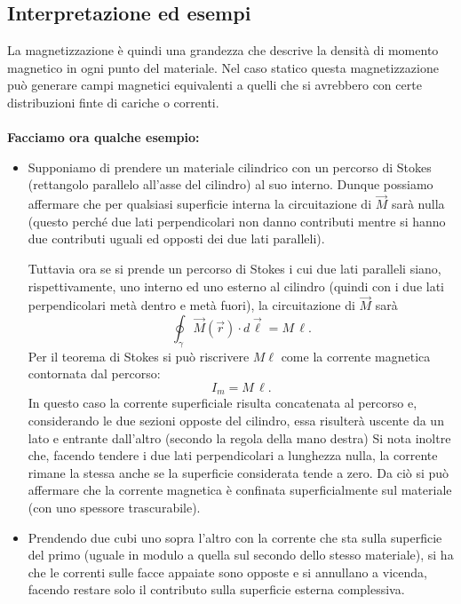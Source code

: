 \documentclass{book}
\begin{document}
\subsection*{Interpretazione ed esempi}
La magnetizzazione è quindi una grandezza che descrive la densità di momento magnetico in ogni punto del materiale. Nel caso statico questa magnetizzazione può generare campi magnetici equivalenti a quelli che si avrebbero con certe distribuzioni finte di cariche o correnti. %
\\
\\
\textbf{Facciamo ora qualche esempio:}
\begin{itemize}
     

\item Supponiamo di prendere un materiale cilindrico con un percorso di Stokes (rettangolo parallelo all'asse del cilindro) al suo interno. Dunque possiamo affermare che per qualsiasi superficie interna la circuitazione di \(\vec{M}\) sarà nulla (questo perché due lati perpendicolari non danno contributi mentre si hanno due contributi uguali ed opposti dei due lati paralleli).

Tuttavia ora se si prende un percorso di Stokes i cui due lati paralleli siano, rispettivamente, uno interno ed uno esterno al cilindro (quindi con i due lati perpendicolari metà dentro e metà fuori), la circuitazione di \(\vec{M}\) sarà
\[
\oint_{\gamma}\vec{M}(\vec{r})\cdot d\vec{\ell} = M\,\ell.
\]
Per il teorema di Stokes si può riscrivere \(M\ell\) come la corrente magnetica contornata dal percorso:
\[
I_m = M\,\ell.
\]
In questo caso la corrente superficiale risulta concatenata al percorso e, considerando le due sezioni opposte del cilindro, essa risulterà uscente da un lato e entrante dall'altro (secondo la regola della mano destra)
Si nota inoltre che, facendo tendere i due lati perpendicolari a lunghezza nulla, la corrente rimane la stessa anche se la superficie considerata tende a zero. Da ciò si può affermare che la corrente magnetica è confinata superficialmente sul materiale (con uno spessore trascurabile).

\item Prendendo due cubi uno sopra l'altro con la corrente che sta sulla superficie del primo (uguale in modulo a quella sul secondo dello stesso materiale), si ha che le correnti sulle facce appaiate sono opposte e si annullano a vicenda, facendo restare solo il contributo sulla superficie esterna complessiva.

\end{itemize}
\end{document}
